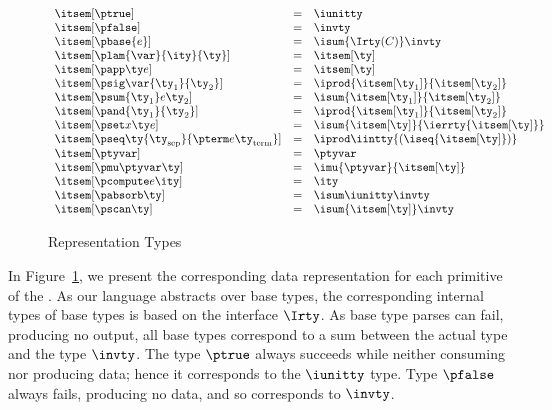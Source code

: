 \begin{figure}
\fbox{$\itsem[\ty] = \ity$}
\[
\begin{array}{lcl} 
\itsem[\ptrue] & = & \iunitty \\
\itsem[\pfalse] & = & \invty \\
\itsem[\pbase{e}] & = & \isum {\Irty(C)} \invty   \\
\itsem[\plam{\var}{\ity}{\ty}] & = & \itsem[\ty] \\
\itsem[\papp \ty e] & = & \itsem[\ty] \\
\itsem[\psig \var {\ty_1} {\ty_2}]  & = & \iprod {\itsem[\ty_1]} {\itsem[\ty_2]}    \\
\itsem[\psum {\ty_1} e {\ty_2}]     & = & \isum {\itsem[\ty_1]} {\itsem[\ty_2]} \\
\itsem[\pand {\ty_1} {\ty_2}]  & = & \iprod {\itsem[\ty_1]}{\itsem[\ty_2]}\\
\itsem[\pset x \ty e] & = & \isum {\itsem[\ty]}{\ierrty {\itsem[\ty]}}\\
\itsem[\pseq \ty {\ty_{\text{sep}}} {\pterm e {\ty_{\text{term}}}}] & = & 
    \iprod \iintty {(\iseq{\itsem[\ty]})}             \\
\itsem[\ptyvar] & = & \ptyvar \\
\itsem[\pmu \ptyvar \ty] & = & \imu{\ptyvar}{\itsem[\ty]} \\
\itsem[\pcompute e \ity]                 & = & \ity \\
\itsem[\pabsorb \ty]                     & = & \isum \iunitty \invty \\
\itsem[\pscan \ty] & = & \isum {\itsem[\ty]} \invty 
\end{array}
\]
\label{fig:rep-tys}
\caption{Representation Types}
\end{figure}

In Figure~\ref{fig:rep-tys}, we present the corresponding data
representation for each primitive of the \ddc{}. As our language
abstracts over base types, the corresponding internal types of base
types is based on the interface $\Irty$. As base type parses can fail,
producing no output, all base types correspond to a sum between the
actual type and the type $\invty$. The \ddc{} type $\ptrue$ always
succeeds while neither consuming nor producing data; hence it
corresponds to the $\iunitty$ type. Type $\pfalse$ always fails,
producing no data, and so corresponds to $\invty$.

